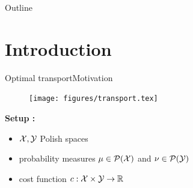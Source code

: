 \documentclass[9pt,xcolor={dvipsnames}]{beamer}
\begin{document}
\begin{frame}
    \titlepage
\end{frame}
\newcommand{\light}[1]{\textcolor{Gray}{#1}}



\begin{frame}{Outline}
  \tableofcontents
\end{frame}


\section{Introduction}

\begin{frame}{Optimal transport}{Motivation}
    \label{slide:fig-transport-1}
        \begin{figure}
            \centering
            \texttt{[image: figures/transport.tex]}
        \end{figure}
    \textbf{Setup :}
    \begin{itemize}
        \item $\mathcal{X},\mathcal{Y}$ Polish spaces
        \item probability measures $\mu\in\mathcal{P}(\mathcal{X})$ and $\nu\in\mathcal{P}(\mathcal{Y})$
        \item cost function $c:\mathcal{X}\times\mathcal{Y}\to\mathbb{R}$
    \end{itemize}
\end{frame}
\end{document}
